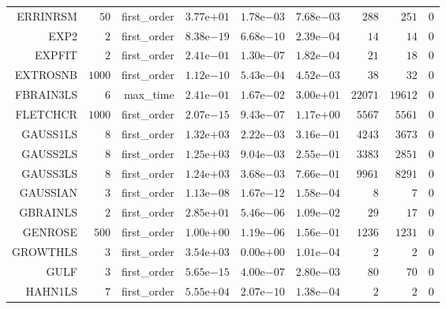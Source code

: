\begin{longtable}{rrrrrrrrr}
ERRINRSM & \(    50\) & first\_order & \( 3.77\)e\(+01\) & \( 1.78\)e\(-03\) & \( 7.68\)e\(-03\) & \(   288\) & \(   251\) & \(     0\) \\
EXP2 & \(     2\) & first\_order & \( 8.38\)e\(-19\) & \( 6.68\)e\(-10\) & \( 2.39\)e\(-04\) & \(    14\) & \(    14\) & \(     0\) \\
EXPFIT & \(     2\) & first\_order & \( 2.41\)e\(-01\) & \( 1.30\)e\(-07\) & \( 1.82\)e\(-04\) & \(    21\) & \(    18\) & \(     0\) \\
EXTROSNB & \(  1000\) & first\_order & \( 1.12\)e\(-10\) & \( 5.43\)e\(-04\) & \( 4.52\)e\(-03\) & \(    38\) & \(    32\) & \(     0\) \\
FBRAIN3LS & \(     6\) & max\_time & \( 2.41\)e\(-01\) & \( 1.67\)e\(-02\) & \( 3.00\)e\(+01\) & \( 22071\) & \( 19612\) & \(     0\) \\
FLETCHCR & \(  1000\) & first\_order & \( 2.07\)e\(-15\) & \( 9.43\)e\(-07\) & \( 1.17\)e\(+00\) & \(  5567\) & \(  5561\) & \(     0\) \\
GAUSS1LS & \(     8\) & first\_order & \( 1.32\)e\(+03\) & \( 2.22\)e\(-03\) & \( 3.16\)e\(-01\) & \(  4243\) & \(  3673\) & \(     0\) \\
GAUSS2LS & \(     8\) & first\_order & \( 1.25\)e\(+03\) & \( 9.04\)e\(-03\) & \( 2.55\)e\(-01\) & \(  3383\) & \(  2851\) & \(     0\) \\
GAUSS3LS & \(     8\) & first\_order & \( 1.24\)e\(+03\) & \( 3.68\)e\(-03\) & \( 7.66\)e\(-01\) & \(  9961\) & \(  8291\) & \(     0\) \\
GAUSSIAN & \(     3\) & first\_order & \( 1.13\)e\(-08\) & \( 1.67\)e\(-12\) & \( 1.58\)e\(-04\) & \(     8\) & \(     7\) & \(     0\) \\
GBRAINLS & \(     2\) & first\_order & \( 2.85\)e\(+01\) & \( 5.46\)e\(-06\) & \( 1.09\)e\(-02\) & \(    29\) & \(    17\) & \(     0\) \\
GENROSE & \(   500\) & first\_order & \( 1.00\)e\(+00\) & \( 1.19\)e\(-06\) & \( 1.56\)e\(-01\) & \(  1236\) & \(  1231\) & \(     0\) \\
GROWTHLS & \(     3\) & first\_order & \( 3.54\)e\(+03\) & \( 0.00\)e\(+00\) & \( 1.01\)e\(-04\) & \(     2\) & \(     2\) & \(     0\) \\
GULF & \(     3\) & first\_order & \( 5.65\)e\(-15\) & \( 4.00\)e\(-07\) & \( 2.80\)e\(-03\) & \(    80\) & \(    70\) & \(     0\) \\
HAHN1LS & \(     7\) & first\_order & \( 5.55\)e\(+04\) & \( 2.07\)e\(-10\) & \( 1.38\)e\(-04\) & \(     2\) & \(     2\) & \(     0\) \\

\end{longtable}
